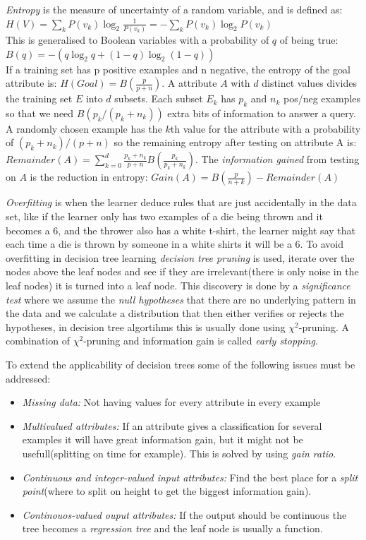 \documentclass[11pt, letterpaper]{report}
\numberwithin{equation}{section}
\begin{document}
\emph{Entropy} is the measure of uncertainty of a random variable, and is
defined as: $H(V) = \sum_k P(v_k)\log_2 \frac{1}{P(v_k)} = -\sum_k
P(v_k)\log_2P(v_k) $ \\
This is generalised to Boolean variables with a probability of $q$ of being
true: $B(q) = -(q\log_2q+(1-q)\log_2(1-q))$ \\
If a training set has p positive examples and n negative, the entropy of the
goal attribute is: $H(Goal) = B(\frac{p}{p+n})$. A attribute $A$ with $d$
distinct values divides the training set $E$ into $d$ subsets. Each subset $E_k$
has $p_k$ and $n_k$ pos/neg examples so that we need $B(p_k/(p_k+n_k))$ extra
bits of information to answer a query. A randomly chosen example has the $k$th
value for the attribute with a probability of $(p_k+n_k)/(p+n)$ so the remaining
entropy after testing on attribute A is: $Remainder(A) =
\sum_{k=0}^d\frac{p_k+n_k}{p+n}B(\frac{p_k}{p_k+n_k})$. The \emph{information gained}
from testing on $A$ is the reduction in entropy: $Gain(A) = B(\frac{p}{n+k}) - Remainder(A)$

\emph{Overfitting} is when the learner deduce rules that are just accidentally
in the data set, like if the learner only has two examples of a die being thrown
and it becomes a 6, and the thrower also has a white t-shirt, the learner might
say that each time a die is thrown by someone in a white shirts it will be a 6.
To avoid overfitting in decision tree learning \emph{decision tree pruning} is
used, iterate over the nodes above the leaf nodes and see if they are
irrelevant(there is only noise in the leaf nodes) it is turned into a leaf node.
This discovery is done by a \emph{significance test} where we assume the
\emph{null hypotheses} that there are no underlying pattern in the data and we
calculate a distribution that then either verifies or rejects the hypotheses, in
decision tree algortihms this is usually done using $\chi^2$-pruning. A
combination of $\chi^2$-pruning and information gain is called \emph{early stopping}.

To extend the applicability of decision trees some of the following issues must
be addressed:
\begin{itemize}
\item \emph{Missing data:} Not having values for every attribute in every example
\item \emph{Multivalued attributes:} If an attribute gives a classification for
  several examples it will have great information gain, but it might not be
  usefull(splitting on time for example). This is solved by using \emph{gain ratio}.
\item \emph{Continuous and integer-valued input attributes:} Find the best place
  for a \emph{split point}(where to split on height to get the biggest
  information gain).
\item \emph{Continouos-valued ouput attributes:} If the output should be
  continuous the tree becomes a \emph{regression tree} and the leaf node is
  usually a function.
\end{itemize}
\end{document}

